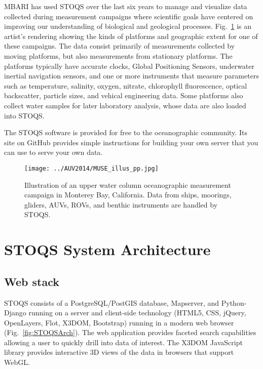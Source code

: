 \documentclass[conference]{IEEEtran}
\begin{document}
MBARI has used STOQS over the last six years to manage and visualize data collected 
during measurement campaigns where scientific goals have centered on improving 
our understanding of biological and geological processes. Fig.~\ref{fig:MUSE_illus_pp} 
is an artist's rendering showing the kinds of platforms and geographic extent for one of
these campaigns.  The data consist primarily of measurements 
collected by moving platforms, but also measurements from stationary platforms. 
The platforms typically have accurate clocks, Global Positioning 
Sensors, underwater inertial navigation sensors, and one or more instruments that measure 
parameters such as temperature, salinity, oxygen, nitrate, chlorophyll fluorescence, 
optical backscatter, particle sizes, and vehical engineering data. Some platforms also collect
water samples for later laboratory analysis, whose data are also loaded into STOQS. 

The STOQS software is provided for free to the oceanographic community. Its site on
GitHub \cite{stoqs_github} provides simple instructions for building your own server that
you can use to serve your own data.

\begin{figure}[htbp]
\centering
\texttt{[image: ../AUV2014/MUSE\_illus\_pp.jpg]}
\caption{Illustration of an upper water column oceanographic measurement campaign in Monterey Bay, California. 
Data from ships, moorings, gliders, AUVs, ROVs, and benthic instruments are handled by STOQS.}
\label{fig:MUSE_illus_pp}
\end{figure}

\section{STOQS System Architecture}

\subsection{Web stack}

STOQS consists of a PostgreSQL/PostGIS database, Mapserver, and Python-Django 
running on a server and client-side technology (HTML5, CSS, jQuery, OpenLayers, Flot,
X3DOM, Bootstrap) running in a modern web browser (Fig.~\ref{fig:STOQSArch}). 
The web application provides faceted search capabilities allowing a user to quickly 
drill into data of interest. The X3DOM JavaScript library provides interactive 
3D views of the data in browsers that support WebGL.  
\end{document}
